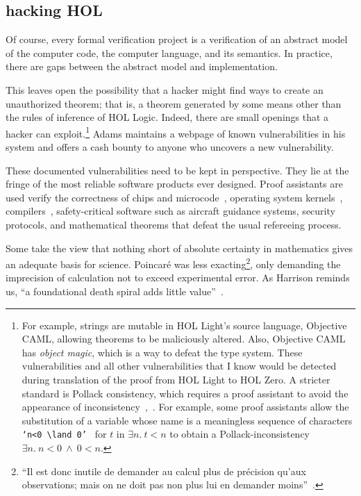 \documentclass{llncs}
\begin{document}
\subsection{hacking HOL}

Of course, every formal verification project is a verification of an
abstract model of the computer code, the computer language, and its
semantics.  In practice, there are gaps between the abstract
model and implementation.

  
This leaves open the possibility that a hacker might find ways to
create an unauthorized theorem; that is, a theorem generated by some
means other than the rules of inference of HOL Logic.  Indeed, there
are small openings that a hacker can exploit.\footnote{For example,
  strings are mutable in HOL Light's source language, Objective CAML,
  allowing theorems to be maliciously altered.  Also, Objective CAML
  has {\it object magic}, which is a way to defeat the type system.
  These vulnerabilities and all other vulnerabilities that I know
  would be detected during translation of the proof from HOL Light to
  HOL Zero.  A stricter standard is Pollack consistency, which
  requires a proof assistant to avoid the appearance of
  inconsistency~\cite{Adams},~\cite{wiedijk:pollack}.  For example,
  some proof assistants allow the substitution of a variable
  whose name is a meaningless sequence of characters {\tt
    `n<0~$\land$~0' } for $t$ in $\exists n.~t<n$ to obtain a
  Pollack-inconsistency $\exists n.~{ {n<0~\land~0}}<n$.  } Adams maintains
a webpage of known vulnerabilities in his system and offers a cash
bounty to anyone who uncovers a new vulnerability.


These documented vulnerabilities need to be kept in perspective.  They
lie at the fringe of the most reliable software products ever
designed. Proof assistants are used verify the correctness of chips
and microcode~\cite{FoxArm6}, operating system kernels~\cite{seL4}, 
compilers~\cite{CC}, safety-critical software such as aircraft
guidance systems, security protocols, and mathematical theorems that
defeat the usual refereeing process.  

Some take the view that nothing short of absolute certainty in
mathematics gives an adequate basis for science.  Poincar\'e was less
exacting\footnote{``Il est donc inutile de demander au calcul plus de
  pr\'ecision qu'aux observations; mais on ne doit pas non plus lui en
  demander moins''~\cite{HPMC}.},
only demanding the imprecision of calculation not to exceed
 experimental error.  As Harrison reminds us, 
``a foundational death spiral adds little value''~\cite{harrison-pm}.
\end{document}

